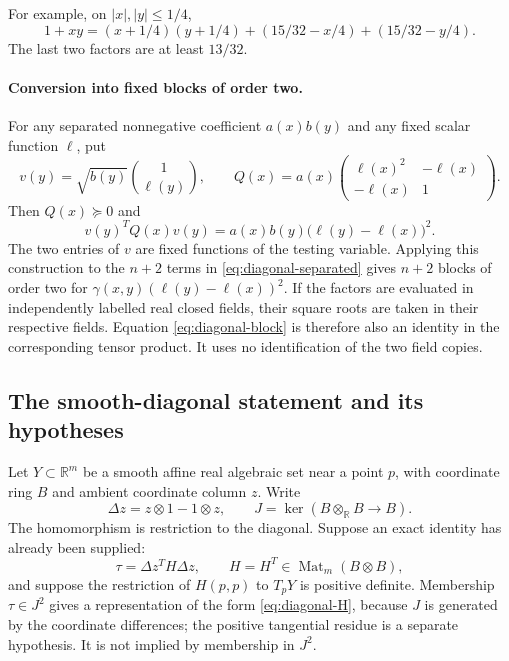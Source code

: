 For example, on $|x|,|y|\le1/4$,
\begin{equation}
 1+xy=(x+1/4)(y+1/4)
      +(15/32-x/4)+(15/32-y/4).
 \label{eq:diagonal-toy}
\end{equation}
The last two factors are at least $13/32$.

\paragraph{Conversion into fixed blocks of order two.}
For any separated nonnegative coefficient $a(x)b(y)$ and any fixed
scalar function $\ell$, put
\[
 v(y)=\sqrt{b(y)}\binom{1}{\ell(y)},\qquad
 Q(x)=a(x)
 \begin{pmatrix}\ell(x)^2&-\ell(x)\\-\ell(x)&1\end{pmatrix}.
\]
Then $Q(x)\succeq0$ and
\begin{equation}
 v(y)^TQ(x)v(y)=a(x)b(y)
                \bigl(\ell(y)-\ell(x)\bigr)^2.
 \label{eq:diagonal-block}
\end{equation}
The two entries of $v$ are fixed functions of the testing variable.
Applying this construction to the $n+2$ terms in
\eqref{eq:diagonal-separated} gives $n+2$ blocks of order two for
$\gamma(x,y)(\ell(y)-\ell(x))^2$.
If the factors are evaluated in independently labelled real closed
fields, their square roots are taken in their respective fields.
Equation \eqref{eq:diagonal-block} is therefore also an identity in
the corresponding tensor product. It uses no identification of the
two field copies.

\subsection{The smooth-diagonal statement and its hypotheses}

Let $Y\subset\mathbb R^m$ be a smooth affine real algebraic set near a
point $p$, with coordinate ring $B$ and ambient coordinate column $z$.
Write
\[
 \Delta z=z\otimes1-1\otimes z,\qquad
 J=\ker(B\otimes_{\mathbb R}B\longrightarrow B).
\]
The homomorphism is restriction to the diagonal. Suppose an exact
identity has already been supplied:
\begin{equation}
 \tau=\Delta z^T H\Delta z,\qquad
 H=H^T\in\operatorname{Mat}_m(B\otimes B),
 \label{eq:diagonal-H}
\end{equation}
and suppose the restriction of $H(p,p)$ to $T_pY$ is positive
definite. Membership $\tau\in J^2$ gives a representation of the form
\eqref{eq:diagonal-H}, because $J$ is generated by the coordinate
differences; the positive tangential residue is a separate hypothesis.
It is not implied by membership in $J^2$.

